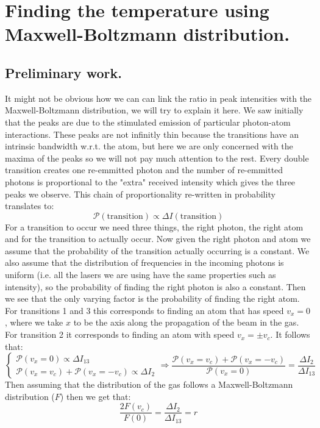 \documentclass[10pt,a4paper]{article}
\newcommand{\prob}{\mathcal{P}}
\begin{document}
\section{Finding the temperature using Maxwell-Boltzmann distribution.}
\subsection{Preliminary work.}
It might not be obvious how we can can link the ratio in peak intensities with the Maxwell-Boltzmann distribution, we will try to explain it here. We saw initially that the peaks are due to the stimulated emission of particular photon-atom interactions. These peaks are not infinitly thin because the transitions have an intrinsic bandwidth w.r.t. the atom, but here we are only concerned with the maxima of the peaks so we will not pay much attention to the rest. Every double transition creates one re-emmitted photon and the number of re-emmitted photons is proportional to the "extra" received intensity which gives the three peaks we observe. This chain of proportionality re-written in probability translates to:
\[
\prob(\text{transition}) \propto \Delta I(\text{transition})
\]
For a transition to occur we need three things, the right photon, the right atom and for the transition to actually occur. Now given the right photon and atom we assume that the probability of the transition actually occurring is a constant. We also assume that the distribution of frequencies in the incoming photons is uniform (i.e. all the lasers we are using have the same properties such as intensity), so the probability of finding the right photon is also a constant. Then we see that the only varying factor is the probability of finding the right atom. For transitions 1 and 3 this corresponds to finding an atom that has speed $v_x = 0$, where we take $x$ to be the axis along the propagation of the beam in the gas. For transition 2 it corresponds to finding an atom with speed $v_x = \pm v_c$. It follows that:
\[
\begin{cases}
\prob(v_x = 0) \propto \Delta I_{13}\\
\prob(v_x = v_c) + \prob(v_x = -v_c) \propto \Delta I_2
\end{cases}
\Rightarrow \frac{\prob(v_x = v_c) + \prob(v_x = -v_c)}{\prob(v_x = 0)} = \frac{\Delta I_2}{\Delta I_{13}}
\]
Then assuming that the distribution of the gas follows a Maxwell-Boltzmann distribution ($F$) then we get that:
\begin{equation}
    \frac{2F(v_c)}{F(0)} = \frac{\Delta I_2}{\Delta I_{13}} = r
\end{equation}
\end{document}
